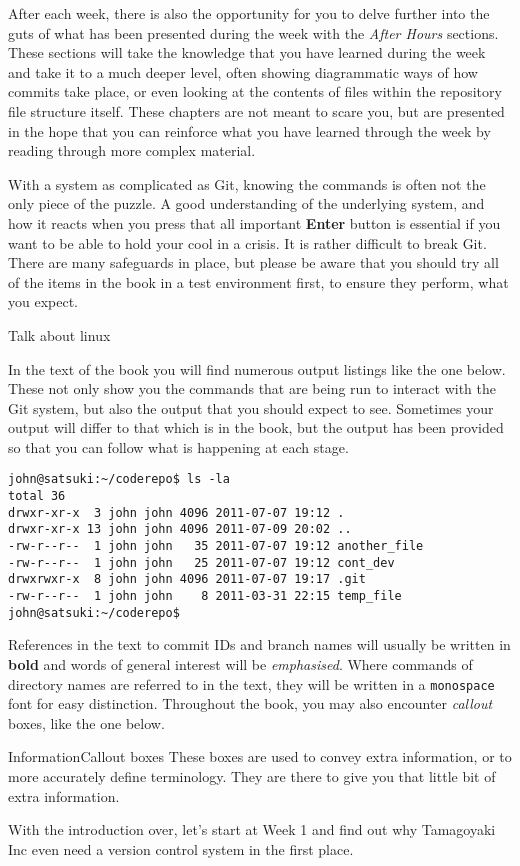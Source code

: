 After each week, there is also the opportunity for you to delve further into the guts of what has been presented during the week with the \emph{After Hours} sections.
These sections will take the knowledge that you have learned during the week and take it to a much deeper level, often showing diagrammatic ways of how commits take place, or even looking at the contents of files within the repository file structure itself.
These chapters are not meant to scare you, but are presented in the hope that you can reinforce what you have learned through the week by reading through more complex material.

With a system as complicated as Git, knowing the commands is often not the only piece of the puzzle.
A good understanding of the underlying system, and how it reacts when you press that all important \textbf{Enter} button is essential if you want to be able to hold your cool in a crisis.
It is rather difficult to break Git.
There are many safeguards in place, but please be aware that you should try all of the items in the book in a test environment first, to ensure they perform, what you expect.

Talk about linux

In the text of the book you will find numerous output listings like the one below.
These not only show you the commands that are being run to interact with the Git system, but also the output that you should expect to see.
Sometimes your output will differ to that which is in the book, but the output has been provided so that you can follow what is happening at each stage.

\begin{Verbatim}
john@satsuki:~/coderepo$ ls -la
total 36
drwxr-xr-x  3 john john 4096 2011-07-07 19:12 .
drwxr-xr-x 13 john john 4096 2011-07-09 20:02 ..
-rw-r--r--  1 john john   35 2011-07-07 19:12 another_file
-rw-r--r--  1 john john   25 2011-07-07 19:12 cont_dev
drwxrwxr-x  8 john john 4096 2011-07-07 19:17 .git
-rw-r--r--  1 john john    8 2011-03-31 22:15 temp_file
john@satsuki:~/coderepo$
\end{Verbatim}

References in the text to commit IDs and branch names will usually be written in \textbf{bold} and words of general interest will be \emph{emphasised}.
Where commands of directory names are referred to in the text, they will be written in a \texttt{monospace} font for easy distinction.
Throughout the book, you may also encounter \emph{callout} boxes, like the one below.

\begin{callout}{Information}{Callout boxes}
These boxes are used to convey extra information, or to more accurately define terminology.
They are there to give you that little bit of extra information.
\end{callout}

With the introduction over, let's start at Week 1 and find out why Tamagoyaki Inc even need a version control system in the first place.
